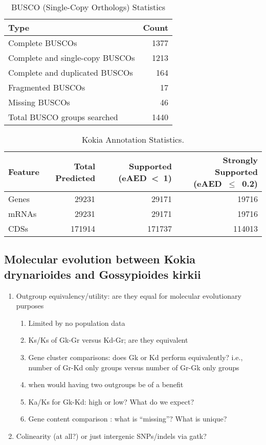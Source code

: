 \documentclass[10pt,letterpaper]{article}
\begin{document}
\begin{table}[ht]
  \begin{center}
    \caption{BUSCO (Single-Copy Orthologs) Statistics}
    \begin{tabular}{lr}
      \toprule
      Type & Count\\
      \midrule
      Complete BUSCOs & 1377\\
      Complete and single-copy BUSCOs & 1213\\
      Complete and duplicated BUSCOs & 164\\
      Fragmented BUSCOs & 17\\
      Missing BUSCOs & 46\\
      Total BUSCO groups searched & 1440\\
      \bottomrule
    \end{tabular}
  \end{center}
\end{table}

\begin{table}[ht]
  \begin{center}
    \caption{Kokia Annotation Statistics.}
    \begin{tabular}{l*{3}{R}}
      \toprule
      Feature & Total Predicted & Supported (eAED~\textless~1) & Strongly Supported (eAED~$\le$~0.2)\cite{Wegrzyn2014} \\
      \midrule
      Genes &  29231 & 29171 & 19716 \\
      mRNAs & 29231 & 29171 & 19716 \\
      CDSs & 171914 & 171737 & 114013 \\
      \bottomrule
    \end{tabular}
  \end{center}
\end{table}

\subsection*{Molecular evolution between Kokia drynarioides and Gossypioides
  kirkii}

\begin{enumerate}
\item Outgroup equivalency/utility: are they equal for molecular evolutionary purposes
  \begin{enumerate}
  \item Limited by no population data
  \item Ks/Ks of Gk-Gr versus Kd-Gr; are they equivalent
  \item Gene cluster comparisons: does Gk or Kd perform equivalently? i.e.,
    number of Gr-Kd only groups versus number of Gr-Gk only groups
  \item when would having two outgroups be of a benefit
  \item Ka/Ks for Gk-Kd: high or low? What do we expect?
  \item Gene content comparison : what is “missing”? What is unique?
  \end{enumerate}
\item Colinearity (at all?) or just intergenic SNPs/indels via gatk?
\end{enumerate}
\end{document}
